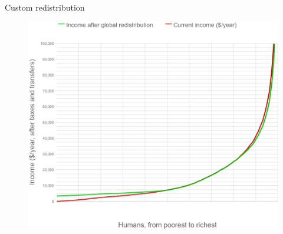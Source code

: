 \documentclass[aspectratio=169,xcolor=dvipsnames, 11pt,mathserif]{beamer}
\begin{document}
\begin{frame}{Custom redistribution \href{run:../figures/questionnaire/survey_custom_redistr.mp4}{} \href{https://bit.ly/custom_redistr}{}}
{\begin{figure}
    \includegraphics[height=.83\textheight]{../figures/questionnaire/survey_custom_redistr_median_zoom.png}\end{figure}}
\end{frame}
\end{document}
